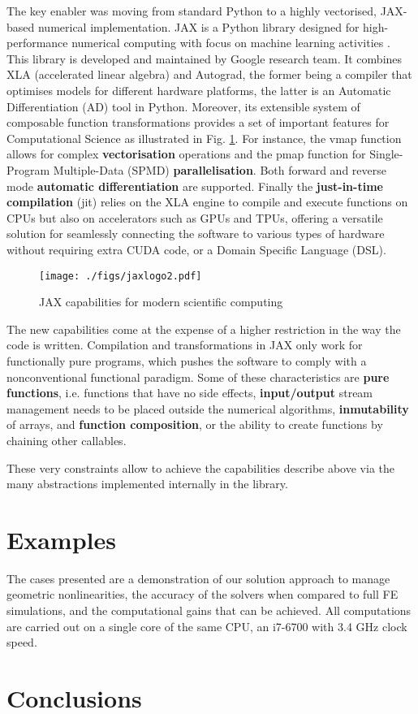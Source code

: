 \documentclass[11pt]{article}
\begin{document}
The key enabler was moving from standard Python to a highly vectorised, JAX-based numerical implementation. JAX is a Python library designed for high-performance numerical computing with focus on machine learning activities \cite{jax2018github}. This library is developed and maintained by Google research team. It combines XLA (accelerated linear algebra) and Autograd, the former being a compiler that optimises models for different hardware platforms, the latter is an Automatic Differentiation (AD) tool in Python. 
Moreover, its extensible system of composable function transformations provides a set of important features for Computational Science as illustrated in Fig. \ref{fig:JAX-overview}. For instance, the vmap function allows for complex \textbf{vectorisation} operations and the pmap function for Single-Program Multiple-Data (SPMD) \textbf{parallelisation}. Both forward and reverse mode \textbf{automatic differentiation} are supported. Finally the \textbf{just-in-time compilation} (jit) relies on the XLA engine to compile and execute functions on CPUs but also on accelerators such as GPUs and TPUs, offering a versatile solution for seamlessly connecting the software to various types of hardware without requiring extra CUDA code, or a Domain Specific Language (DSL).

\begin{figure}[htbp]
\centering
\texttt{[image: ./figs/jaxlogo2.pdf]}
\caption{\label{fig:JAX-overview} JAX capabilities for modern scientific computing}
\end{figure}
The new capabilities come at the expense of a higher restriction in the way the code is written. Compilation and transformations in JAX only work for functionally pure programs, which pushes the software to comply with a nonconventional functional paradigm. Some of these characteristics are \textbf{pure functions}, i.e. functions that have no side effects, \textbf{input/output} stream management needs to be placed outside the numerical algorithms, \textbf{inmutability} of arrays, and \textbf{function composition}, or the ability to create functions by chaining other callables.

These very constraints allow to achieve the capabilities describe above via the many abstractions implemented internally in the library.

\section{Examples}
\label{sec:org8e113e6}
The cases presented are a demonstration of our solution approach to manage geometric nonlinearities, the accuracy of the solvers when compared to full FE simulations, and the computational gains that can be achieved.
All computations are carried out on a single core of the same CPU, an i7-6700 with 3.4 GHz clock speed.
\section{Conclusions}
\label{sec:org43c9622}



\end{document}
